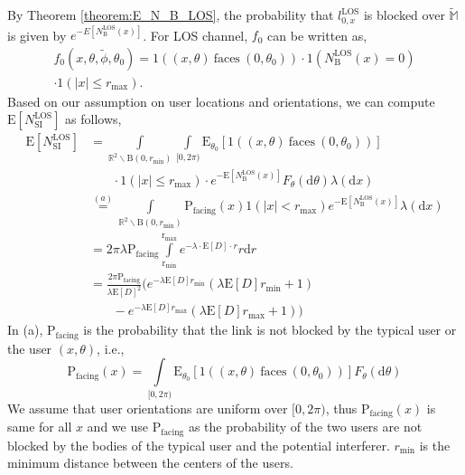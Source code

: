 \documentclass[10pt, conference, letterpaper]{IEEEtran}
\begin{document}
By Theorem \ref{theorem:E_N_B_LOS}, the probability that $l_{0,x}^{\mathrm{LOS}}$ is blocked over $\mathbb{\tilde{M}}$ is given by $e^{-E[N_\mathrm{B}^\mathrm{LOS}(x)]}$. For LOS channel, $f_0$ can be written as, 
\begin{multline}\label{eq:f0_LOS}
	f_0(x,\theta, \tilde{\phi},\theta_0)=\text{1}((x,\theta)\mathrm{~faces~}(0,\theta_0))\cdot\mathrm{1}(N_\mathrm{B}^\mathrm{LOS}(x)=0) \\
	\cdot\text{1}(|x|\leq r_{\max}). 
\end{multline}
Based on our assumption on user locations and orientations, we can compute $\mathrm{E}[N_{\mathrm{SI}}^{\text{LOS}}]$ as follows, 
\begin{equation}
\begin{aligned}
\mathrm{E}[N_{\mathrm{SI}}^{\text{LOS}}] &= \int\limits_{\mathbb{R}^2\backslash\mathrm{B}(0,r_{\text{min}})} \int\limits_{[0,2\pi)}\mathrm{E}_{\theta_0}[\text{1}((x,\theta)\mathrm{~faces~}(0,\theta_0))]\\
& \phantom{{}=1} \cdot\text{1}(|x|\leq r_{\max})\cdot e^{-\mathrm{E}[N_{\mathrm{B}}^\mathrm{LOS}(x)]}F_{\theta}(\mathrm{d}\theta)\lambda(\mathrm{d}x)\\
& \stackrel{(a)} = \int\limits_{\mathbb{R}^2\backslash\mathrm{B}(0,r_{\text{min}})}
\mathrm{P}_{\text{facing}}(x)\text{1}(|x|<r_{\text{max}})e^{-\mathrm{E}[N_{\mathrm{B}}^\mathrm{LOS}(x)]}\lambda(\mathrm{d}x)\\
& = 2\pi\lambda \mathrm{P}_{\text{facing}}\int\limits_{\mathrm{r_{min}}}^{\mathrm{r_{max}}}e^{-\lambda\cdot\mathrm{E}[D]\cdot r}r\mathrm{d}r\\
& =\frac{2\pi \mathrm{P}_{\text{facing}}}{\lambda \mathrm{E}[D]^2}\big( e^{-\lambda\mathrm{E}[D]r_{\mathrm{min}}}(\lambda\mathrm{E}[D]r_{\mathrm{min}} + 1)\\
& \phantom{{}=1} - e^{-\lambda\mathrm{E}[D]r_{\mathrm{max}}}(\lambda\mathrm{E}[D]r_{\mathrm{max}} + 1)\big)
\end{aligned} 
\end{equation}
In (a), $\mathrm{P}_{\text{facing}}$ is the probability that the link is not blocked by the typical user or the user $(x,\theta)$, i.e.,
\begin{equation*}
\mathrm{P}_{\text{facing}}(x) = \int\limits_{[0,2\pi)}\mathrm{E}_{\theta_0}[\text{1}((x,\theta)\mathrm{~faces~}(0,\theta_0))]F_{\theta}(\mathrm{d}\theta)
\end{equation*}
We assume that user orientations are uniform over $[0, 2\pi)$, thus $\mathrm{P}_{\text{facing}}(x)$ is same for all $x$ and we use $\mathrm{P}_{\text{facing}}$ as the probability of the two users are not blocked by the bodies of the typical user and the potential interferer. $r_{\mathrm{min}}$ is the minimum distance between the centers of the users.
\end{document}
